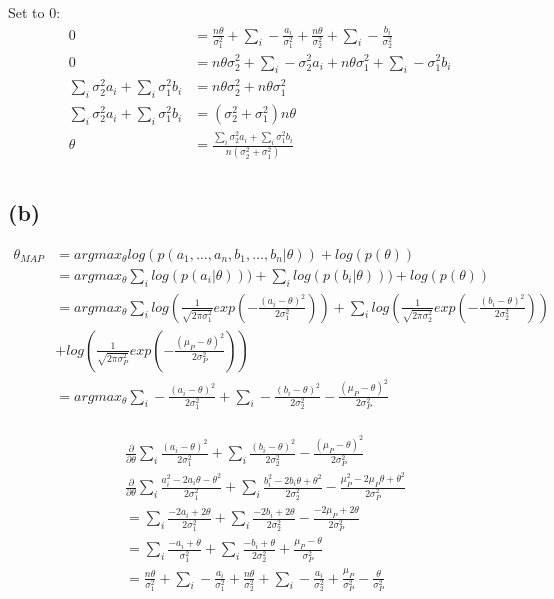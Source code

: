 \documentclass[a4paper]{scrartcl}
\begin{document}
    Set to 0:
    \begin{align*}
      0 &= \frac{n \theta }{\sigma_1^2} + \sum_i - \frac{a_i}{\sigma_1^2} + \frac{n \theta }{\sigma_2^2} + \sum_i - \frac{b_i}{\sigma_2^2}\\
      0 &= n\theta \sigma_2^2 + \sum_i - \sigma_2^2 a_i + n\theta \sigma_1^2 + \sum_i - \sigma_1^2 b_i\\
      \sum_i \sigma_2^2 a_i + \sum_i \sigma_1^2 b_i &= n\theta \sigma_2^2  + n\theta \sigma_1^2\\
      \sum_i \sigma_2^2 a_i + \sum_i \sigma_1^2 b_i &= (\sigma_2^2 + \sigma_1^2) n\theta\\
      \theta &= \frac{\sum_i \sigma_2^2 a_i + \sum_i \sigma_1^2 b_i}{n(\sigma_2^2 + \sigma_1^2)} \\
    \end{align*}

  \subsection*{(b)}
    \begin{align*}
      \theta_{MAP}
      &= argmax_\theta log(p(a_1, \dots , a_n, b_1, \dots , b_n \vert \theta)) + log(p(\theta))\\
      &= argmax_\theta \sum_i log(p(a_i \vert \theta))) + \sum_i log(p(b_i \vert \theta )))+ log(p(\theta))\\
      &= argmax_\theta \sum_i log(\frac{1}{\sqrt{2\pi \sigma_1^2}} exp(-\frac{(a_i - \theta )^2}{2\sigma_1^2})) + \sum_i log(\frac{1}{\sqrt{2\pi \sigma_2^2}} exp(-\frac{(b_i - \theta )^2}{2\sigma_2^2})) \\
      &+ log(\frac{1}{\sqrt{2 \pi \sigma_P^2}}exp(-\frac{(\mu_P - \theta)^2}{2\sigma_P^2})) \\
      &= argmax_\theta \sum_i -\frac{(a_i - \theta )^2}{2\sigma_1^2} + \sum_i-\frac{(b_i - \theta )^2}{2\sigma_2^2} - \frac{(\mu_P - \theta)^2}{2\sigma_P^2}\\ 
    \end{align*}

    \begin{align*}
      & \frac{\partial}{\partial \theta} \sum_i \frac{(a_i - \theta )^2}{2\sigma_1^2} + \sum_i \frac{(b_i - \theta )^2}{2\sigma_2^2}- \frac{(\mu_P - \theta)^2}{2\sigma_P^2}\\
      & \frac{\partial}{\partial \theta} \sum_i \frac{a_i^2 - 2a_i \theta - \theta^2}{2\sigma_1^2} + \sum_i \frac{b_i^2 -2b_i \theta + \theta^2}{2\sigma_2^2}- \frac{\mu_P^2 - 2\mu_P \theta + \theta^2}{2\sigma_P^2}\\
      &= \sum_i \frac{-2a_i + 2\theta}{2\sigma_1^2} + \sum_i \frac{-2b_i  + 2\theta}{2\sigma_2^2}- \frac{- 2\mu_P + 2\theta}{2\sigma_P^2}\\
      &= \sum_i \frac{-a_i + \theta}{\sigma_1^2} + \sum_i \frac{-b_i  + \theta}{2\sigma_2^2} + \frac{\mu_P - \theta}{\sigma_P^2}\\
      &= \frac{n \theta }{\sigma_1^2} + \sum_i - \frac{a_i}{\sigma_1^2} + \frac{n \theta }{\sigma_2^2} + \sum_i - \frac{a_i}{\sigma_2^2} + \frac{\mu_P}{\sigma_P^2} - \frac{\theta}{\sigma_P^2}\\
    \end{align*}
\end{document}
